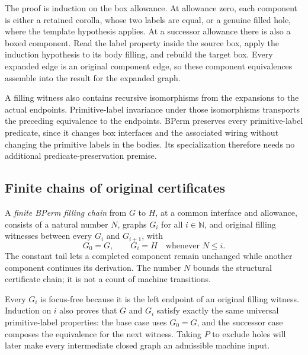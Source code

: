 The proof is induction on the box allowance. At allowance zero, each component
is either a retained corolla, whose two labels are equal, or a genuine filled
hole, where the template hypothesis applies. At a successor allowance there
is also a boxed component. Read the label property inside the source box,
apply the induction hypothesis to its body filling, and rebuild the target
box. Every expanded edge is an original component edge, so these component
equivalences assemble into the result for the expanded graph.


A filling witness also contains recursive isomorphisms from the expansions
to the actual endpoints. Primitive-label invariance under those isomorphisms
transports the preceding equivalence to the endpoints. BPerm preserves every
primitive-label predicate, since it changes box interfaces and the associated
wiring without changing the primitive labels in the bodies. Its specialization
therefore needs no additional predicate-preservation premise.


\subsection{Finite chains of original certificates}
A \emph{finite BPerm filling chain} from $G$ to $H$, at a common interface
and allowance, consists of a natural number $N$, graphs $G_i$ for all
$i\in\mathbb N$, and original filling witnesses between every $G_i$ and
$G_{i+1}$, with
\[
 G_0=G,\qquad G_i=H\quad\text{whenever }N\leq i.
\]
The constant tail lets a completed component remain unchanged while another
component continues its derivation. The number $N$ bounds the structural
certificate chain; it is not a count of machine transitions.


Every $G_i$ is focus-free because it is the left endpoint of an original
filling witness. Induction on $i$ also proves that $G$ and $G_i$ satisfy
exactly the same universal primitive-label properties: the base case uses
$G_0=G$, and the successor case composes the equivalence for the next witness.
Taking $P$ to exclude holes will later make every intermediate closed graph
an admissible machine input.

